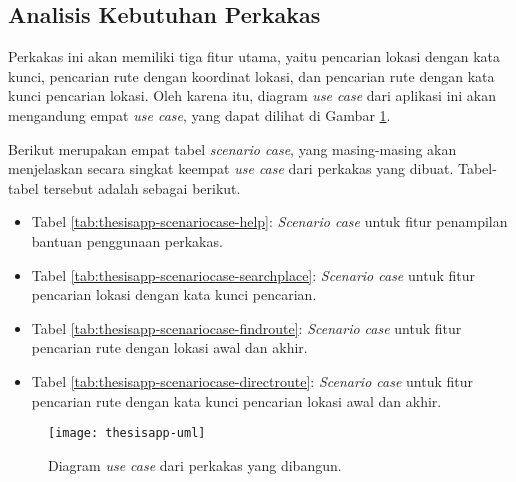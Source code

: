 \subsection{Analisis Kebutuhan Perkakas}
\label{sec:analysis-thesisapp-usecases}

Perkakas \cl\xspace ini akan memiliki tiga fitur utama, yaitu pencarian lokasi dengan kata kunci, pencarian rute dengan koordinat \latlon\xspace lokasi, dan pencarian rute dengan kata kunci pencarian lokasi. Oleh karena itu, diagram \textit{use case} dari aplikasi ini akan mengandung empat \textit{use case}, yang dapat dilihat di Gambar \ref{fig:thesisapp-uml}. 

Berikut merupakan empat tabel \textit{scenario case}, yang masing-masing akan menjelaskan secara singkat keempat \textit{use case} dari perkakas yang dibuat. Tabel-tabel tersebut adalah sebagai berikut.

\begin{itemize}
	\item Tabel \ref{tab:thesisapp-scenariocase-help}: \textit{Scenario case} untuk fitur penampilan bantuan penggunaan perkakas.
	\item Tabel \ref{tab:thesisapp-scenariocase-searchplace}: \textit{Scenario case} untuk fitur pencarian lokasi dengan kata kunci pencarian.
	\item Tabel \ref{tab:thesisapp-scenariocase-findroute}: \textit{Scenario case} untuk fitur pencarian rute dengan \latlon\xspace lokasi awal dan akhir.
	\item Tabel \ref{tab:thesisapp-scenariocase-directroute}: \textit{Scenario case} untuk fitur pencarian rute dengan kata kunci pencarian lokasi awal dan akhir.
\end{itemize}

\begin{figure}[H]
    \centering
    \texttt{[image: thesisapp-uml]}
    \caption[Diagram \textit{use case} perkakas yang dibangun]{Diagram \textit{use case} dari perkakas yang dibangun.}
    \label{fig:thesisapp-uml}
\end{figure}

